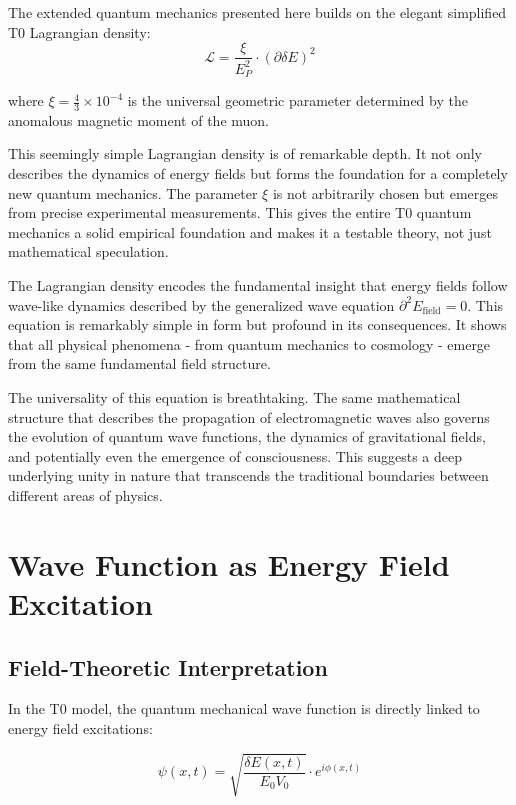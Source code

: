 \documentclass[12pt,a4paper]{article}
\newcommand{\deltaE}{\delta E}
\newcommand{\xipar}{\xi}
\newcommand{\EPlanck}{E_P}
\theoremstyle{definition}
\theoremstyle{remark}
\begin{document}
The extended quantum mechanics presented here builds on the elegant simplified T0 Lagrangian density:
\begin{equation}
	\mathcal{L} = \frac{\xipar}{\EPlanck^2} \cdot (\partial \deltaE)^2
\end{equation}

where $\xipar = \frac{4}{3} \times 10^{-4}$ is the universal geometric parameter determined by the anomalous magnetic moment of the muon.

This seemingly simple Lagrangian density is of remarkable depth. It not only describes the dynamics of energy fields but forms the foundation for a completely new quantum mechanics. The parameter $\xipar$ is not arbitrarily chosen but emerges from precise experimental measurements. This gives the entire T0 quantum mechanics a solid empirical foundation and makes it a testable theory, not just mathematical speculation.

The Lagrangian density encodes the fundamental insight that energy fields follow wave-like dynamics described by the generalized wave equation $\partial^2 E_{\text{field}} = 0$. This equation is remarkably simple in form but profound in its consequences. It shows that all physical phenomena - from quantum mechanics to cosmology - emerge from the same fundamental field structure.

The universality of this equation is breathtaking. The same mathematical structure that describes the propagation of electromagnetic waves also governs the evolution of quantum wave functions, the dynamics of gravitational fields, and potentially even the emergence of consciousness. This suggests a deep underlying unity in nature that transcends the traditional boundaries between different areas of physics.

\section{Wave Function as Energy Field Excitation}

\subsection{Field-Theoretic Interpretation}

In the T0 model, the quantum mechanical wave function is directly linked to energy field excitations:

\begin{equation}
	\boxed{\psi(x,t) = \sqrt{\frac{\deltaE(x,t)}{E_0 V_0}} \cdot e^{i\phi(x,t)}}
	\label{eq:wavefunction_field}
\end{equation}
\end{document}
